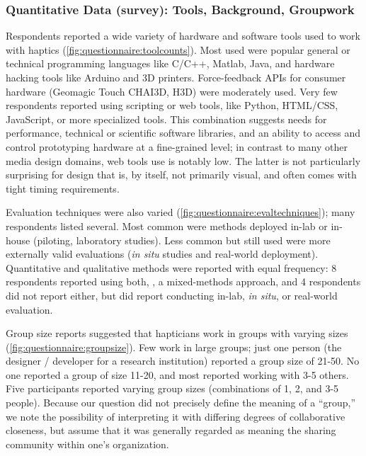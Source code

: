 \subsubsection{Quantitative Data (survey): Tools, Background, Groupwork}
%
\noindent
Respondents reported a wide variety of hardware and software tools used to work with haptics (\autoref{fig:questionnaire:toolcounts}).
Most used were popular general or technical programming languages like C/C++, Matlab, Java, and hardware hacking tools like Arduino and 3D printers.
Force-feedback APIs for consumer hardware (Geomagic Touch CHAI3D, H3D) were moderately used.
Very few respondents reported using scripting or web tools, like Python, HTML/CSS, JavaScript, or more specialized tools.
This combination suggests needs for  performance, technical or scientific software libraries, and an ability to access and control prototyping hardware at a fine-grained level; %
in contrast to many other media design domains, web tools use is notably low. 
The latter is not particularly surprising for design that is, by itself, not primarily visual, and often comes with tight timing requirements. %

Evaluation techniques were also varied (\autoref{fig:questionnaire:evaltechniques}); 
many respondents listed several.
Most common were methods deployed in-lab or in-house (piloting, laboratory studies).
Less common but still used were more externally valid evaluations (\emph{in situ} studies and real-world deployment).
Quantitative and qualitative methods were reported with equal frequency: 8 respondents reported using both, \ie, a mixed-methods approach, and 4 respondents did not report either, but did report conducting in-lab, \emph{in situ}, or real-world evaluation.


Group size reports suggested that hapticians work in groups with varying sizes (\autoref{fig:questionnaire:groupsize}).
Few work in large groups; just one person (the designer / developer for a research institution) reported a group size of 21-50. No one reported a group of size 11-20,
and most reported working with 3-5 others.
Five participants reported varying group sizes (combinations of 1, 2, and 3-5 people).
Because our question did not precisely define the meaning of a ``group,'' we note the possibility of interpreting it with differing degrees of collaborative closeness, but assume that it was generally regarded as meaning the sharing community within one's organization.

